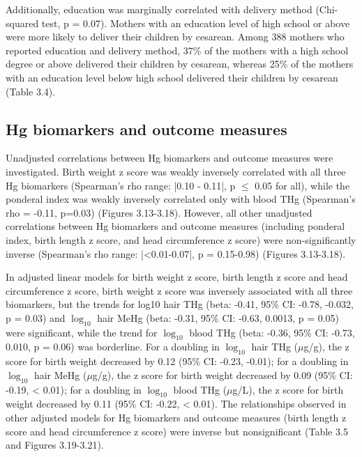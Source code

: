 Additionally, education was marginally correlated with delivery method (Chi-squared test, p = 0.07). Mothers with an education level of high school or above were more likely to deliver their children by cesarean. Among 388 mothers who reported education and delivery method, 37\% of the mothers with a high school degree or above delivered their children by cesarean, whereas 25\% of the mothers with an education level below high school delivered their children by cesarean (Table 3.4).

\subsection{Hg biomarkers and outcome measures}

Unadjusted correlations between Hg biomarkers and outcome measures were investigated. Birth weight z score was weakly inversely correlated with all three Hg biomarkers (Spearman's rho range: |0.10 - 0.11|, p ${\le}$ 0.05 for all), while the ponderal index was weakly inversely correlated only with blood THg (Spearman's rho = -0.11, p=0.03) (Figures 3.13-3.18). However, all other unadjusted correlations between Hg biomarkers and outcome measures (including ponderal index, birth length z score, and head circumference z score) were non-significantly inverse (Spearman's rho range: |<0.01-0.07|, p = 0.15-0.98) (Figures 3.13-3.18).

In adjusted linear models for birth weight z score, birth length z score and head circumference z score, birth weight z score was inversely associated with all three biomarkers, but the trends for log10 hair THg (beta: -0.41, 95\% CI: -0.78, -0.032, p = 0.03) and $\log_{10}$ hair MeHg (beta: -0.31, 95\% CI: -0.63, 0.0013, p = 0.05) were significant, while the trend for $\log_{10}$ blood THg (beta: -0.36, 95\% CI: -0.73, 0.010, p = 0.06) was borderline. For a doubling in $\log_{10}$ hair THg (${\mu}$g/g), the z score for birth weight decreased by 0.12 (95\% CI: -0.23, -0.01); for a doubling in $\log_{10}$ hair MeHg (${\mu}$g/g), the z score for birth weight decreased by 0.09 (95\% CI: -0.19, < 0.01); for a doubling in $\log_{10}$ blood THg (${\mu}$g/L), the z score for birth weight decreased by 0.11 (95\% CI: -0.22, < 0.01). The relationships observed in other adjusted models for Hg biomarkers and outcome measures (birth length z score and head circumference z score) were inverse but nonsignificant (Table 3.5 and Figures 3.19-3.21).

